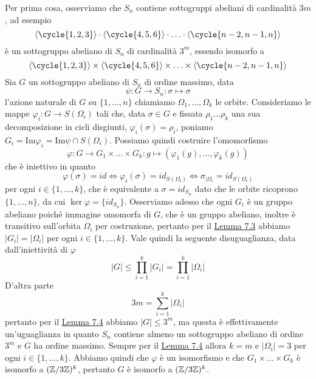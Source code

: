 \documentclass[11pt]{scrartcl}
\begin{document}
\begin{soln}
    Per prima cosa, osserviamo che $S_n$ contiene sottogruppi abeliani di
    cardinalità $3m$, ad esempio
    \[
        \langle\cycle{1, 2, 3}\rangle\cdot \langle\cycle{4, 5, 6}\rangle
        \cdot \ldots \cdot \langle\cycle{n - 2, n - 1, n}\rangle
    \]
    è un sottogruppo abeliano di $S_n$ di cardinalità $3^m$, essendo 
    isomorfo a
    \[
        \langle\cycle{1, 2, 3}\rangle\times\langle\cycle{4, 5, 6}\rangle
        \times\ldots\times\langle\cycle{n - 2, n - 1, n}\rangle
    \]
    Sia $G$ un sottogruppo abeliano di $S_n$ di ordine massimo, data
    \[
        \psi: G\longrightarrow S_n : \sigma \longmapsto \sigma
    \]
    l'azione naturale di $G$ su $\{1, \ldots, n\}$ chiamiamo $\Omega_1, \ldots, \Omega_k$
    le orbite. Consideriamo le mappe $\varphi_i : G \longrightarrow S(\Omega_i)$
    tali che, data $\sigma \in G$ e fissata $\rho_1\ldots\rho_k$ una sua decomposizione
    in cicli disgiunti, $\varphi_i(\sigma) = \rho_i$, poniamo $G_i = \mathrm{Im}\varphi_i=
    \mathrm{Im}\psi \cap S(\Omega_i)$. Possiamo quindi costruire l'omomorfismo
    \[
        \varphi: G \longrightarrow G_1\times \ldots \times G_k : g \longmapsto (\varphi_1(g), \ldots, \varphi_k(g))
    \]
    che è iniettivo in quanto 
    \[
        \varphi(\sigma) = id \iff \varphi_i(\sigma) = id_{S(\Omega_i)} \iff 
        \sigma_{\mid \Omega_i} = id_{S(\Omega_i)}
    \]
    per ogni $i \in \{1, \ldots, k\}$, che è equivalente a $\sigma = id_{S_n}$
    dato che le orbite ricoprono $\{1, \ldots, n\}$, da cui $\ker\varphi = 
    \{id_{S_n}\}$. Osserviamo adesso che ogni $G_i$ è un gruppo abeliano poiché
    immagine omomorfa di $G$, che è un gruppo abeliano, inoltre è transitivo
    sull'orbita $\Omega_i$ per costruzione, pertanto per il 
    \hyperref[lemma3.0]{Lemma 7.3} abbiamo $|G_i| = |\Omega_i|$ per ogni 
     $i \in \{1, \ldots, k\}$. Vale quindi la seguente disuguaglianza, data
    dall'iniettività di $\varphi$
    \[
        |G| \leqslant \prod_{i = 1}^k|G_i| = \prod_{i = 1}^k |\Omega_i|
    \]
    D'altra parte
    \[
        3m = \sum_{i = 1}^k|\Omega_i|
    \]pertanto per il \hyperref[lemma4.0]{Lemma 7.4} abbiamo $|G| \leq 3^m$, 
    ma questa è effettivamente un'uguaglianza in quanto $S_n$ contiene
    almeno un sottogruppo abeliano di ordine $3^m$ e $G$ ha ordine massimo.
    Sempre per il \hyperref[lemma4.0]{Lemma 7.4} allora $k = m$ e $|\Omega_i| = 3$
    per ogni $i \in \{1, \ldots, k\}$. Abbiamo quindi che $\varphi$ è un isomorfismo
    e che $G_1\times\ldots\times G_k$ è isomorfo a $(\mathbb{Z}/{3}\mathbb{Z})^k$, pertanto
    $G$ è isomorfo a $(\mathbb{Z}/{3}\mathbb{Z})^k$.
\end{soln}
\end{document}
